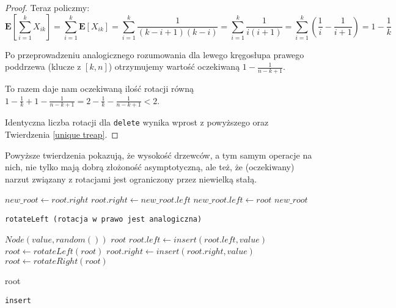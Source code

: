 \begin{proof}
Teraz policzmy:
$$
\mathbf{E}[\sum_{i=1}^{k}X_{ik}]=
\sum_{i=1}^{k}\mathbf{E}[X_{ik}]=
\sum_{i=1}^{k}\frac{1}{(k-i+1)(k-i)}=
\sum_{i=1}^{k}\frac{1}{i(i+1)}=
\sum_{i=1}^{k}(\frac{1}{i}-\frac{1}{i+1})=
1-\frac{1}{k}
$$

Po przeprowadzeniu analogicznego rozumowania dla lewego kręgosłupa prawego poddrzewa (klucze z $[k,n]$) otrzymujemy wartość oczekiwaną $1 - \frac{1}{n-k+1}$.

To razem daje nam oczekiwaną ilość rotacji równą $1 - \frac{1}{k} + 1 - \frac{1}{n-k+1} = 2 -  \frac{1}{k} - \frac{1}{n-k+1} < 2$.

Identyczna liczba rotacji dla \texttt{delete} wynika wprost z powyższego oraz Twierdzenia \ref{unique treap}.
\end{proof}

Powyższe twierdzenia pokazują, że wysokość drzewców, a tym samym operacje na nich, nie tylko mają dobrą złożoność asymptotyczną, ale też, że (oczekiwany) narzut związany z rotacjami jest ograniczony przez niewielką stałą.

\newpage

\begin{algorithm}
  \DontPrintSemicolon


  $new\_root \leftarrow root.right$\;
  $root.right \leftarrow new\_root.left$\;
  $new\_root.left \leftarrow root$\;
  \Return $new\_root$\;
  
  \caption{\texttt{rotateLeft (rotacja w prawo jest analogiczna)}}
  \label{treap-rotate-left}
\end{algorithm}

\begin{algorithm}
  \DontPrintSemicolon

  {
    \Return $Node(value, random())$\;
  }
  {
    \Return $root$\;
  }
  {
    $root.left \leftarrow insert(root.left, value)$\;
    {
      $root \leftarrow rotateLeft(root)$\;
    }
  }
  {
    $root.right \leftarrow insert(root.right, value)$\;
    {
      $root \leftarrow rotateRight(root)$\;
    }
  }
  
  \Return root\;
  \caption{\texttt{insert}}
  \label{treap-insert}
\end{algorithm}

